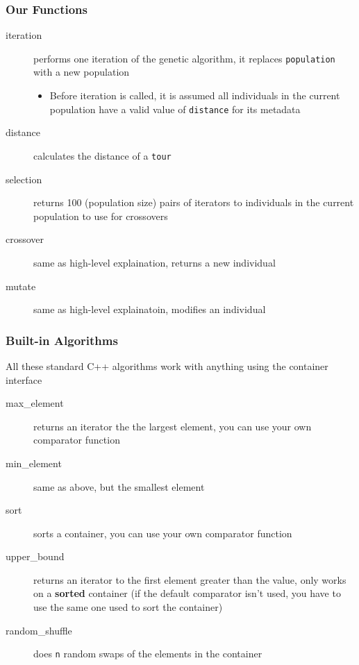 \documentclass[aspectratio=169,10pt,compress]{beamer}
\begin{document}
\begin{frame}
  \frametitle{Our Functions}

  \begin{description}
    \item[\ttfamily iteration] performs one iteration of the genetic algorithm, it
      replaces {\tt population} with a new population
      \begin{itemize}
        \item Before iteration is called, it is assumed all individuals in the
          current population have a valid value of {\tt distance} for its
          metadata
      \end{itemize}
    \item [\ttfamily distance] calculates the distance of a {\tt tour}
    \item [\ttfamily selection] returns 100 (population size) pairs of iterators to
      individuals in the current population to use for crossovers
    \item [\ttfamily crossover] same as high-level explaination, returns a new
      individual
    \item [\ttfamily mutate] same as high-level explainatoin, modifies an individual
  \end{description}
\end{frame}

\begin{frame}
  \frametitle{Built-in Algorithms}

  All these standard C++ algorithms work with anything using the container
  interface

  \begin{description}
    \item[\ttfamily max\_element] returns an iterator the the largest element, you
      can use your own comparator function
    \item[\ttfamily min\_element] same as above, but the smallest element
    \item[\ttfamily sort] sorts a container, you can use your own comparator function
    \item[\ttfamily upper\_bound] returns an iterator to the first element greater
      than the value, only works on a {\bf sorted} container (if the default
      comparator isn't used, you have to use the same one used to sort the
      container)
    \item[\ttfamily random\_shuffle] does {\tt n} random swaps of the elements in
      the container
  \end{description}
\end{frame}
\end{document}
